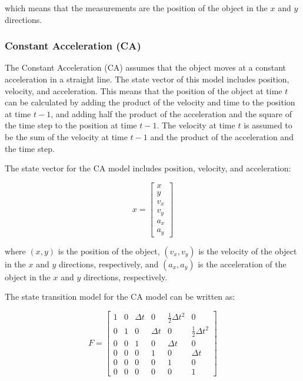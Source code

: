 which means that the measurements are the position of the object in the $x$ and $y$ directions.

\subsubsection{Constant Acceleration (CA)}
\label{subsubsec:3_CA}

The Constant Acceleration (CA) assumes that the object moves at a constant acceleration in a straight line. The state vector of this model includes position, velocity, and acceleration. This means that the position of the object at time $t$ can be calculated by adding the product of the velocity and time to the position at time $t-1$, and adding half the product of the acceleration and the square of the time step to the position at time $t-1$. The velocity at time $t$ is assumed to be the sum of the velocity at time $t-1$ and the product of the acceleration and the time step.

The state vector for the CA model includes position, velocity, and acceleration:

\begin{equation}
	x = \begin{bmatrix}x \\
		y \\
		v_x \\
		v_y \\
		a_x \\ 
		a_y
	\end{bmatrix}
\end{equation}

where $(x,y)$ is the position of the object, $(v_x,v_y)$ is the velocity of the object in the $x$ and $y$ directions, respectively, and $(a_x,a_y)$ is the acceleration of the object in the $x$ and $y$ directions, respectively.

The state transition model for the CA model can be written as:

\begin{equation}
	F = \begin{bmatrix}
		1 & 0 & \Delta t & 0 & \frac{1}{2}\Delta t^2 & 0 \\ 
		0 & 1 & 0 & \Delta t & 0 & \frac{1}{2}\Delta t^2 \\ 
		0 & 0 & 1 & 0 & \Delta t & 0 \\ 
		0 & 0 & 0 & 1 & 0 & \Delta t \\ 
		0 & 0 & 0 & 0 & 1 & 0 \\ 
		0 & 0 & 0 & 0 & 0 & 1
	\end{bmatrix}
\end{equation}

